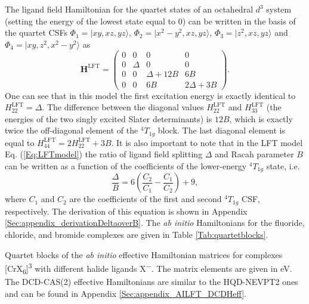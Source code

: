 The ligand field Hamiltonian for the quartet states of an octahedral $d^3$ system (setting the energy of the lowest state equal to 0) can be written in the basis of the quartet CSFs ${\Phi _1} = |xy,xz,yz\rangle $, ${\Phi _2} = |{x^2} - {y^2},xz,yz\rangle $, ${\Phi _3} = |{z^2},xz,yz\rangle $ and ${\Phi _4} = |xy,{z^2},{x^2} - {y^2}\rangle $ as
	\begin{equation}
	\label{Eq:LFTmodel}
	{{\mathbf{H}}^{{\text{LFT}}}} = \left( {\begin{array}{*{20}{c}}
  0&0&0&0 \\ 
  0&\Delta &0&0 \\ 
  0&0&{\Delta  + 12B}&{6B} \\ 
  0&0&{6B}&{2\Delta  + 3B} 
\end{array}} \right).
\end{equation}
One can see that in this model the first excitation energy is exactly identical to $H_{22}^{{\text{LFT}}} = \Delta $. The difference between the diagonal values $H_{22}^{{\text{LFT}}}$ and $H_{33}^{{\text{LFT}}}$ (the energies of the two singly excited Slater determinants) is $12B$, which is exactly twice the off-diagonal element of the $^4T_{1g}$ block. The last diagonal element is equal to $H_{44}^{{\text{LFT}}} = 2H_{22}^{{\text{LFT}}} + 3B$. It is also important to note that in the LFT model Eq. (\ref{Eq:LFTmodel}) the ratio of ligand field splitting $\Delta $ and Racah parameter $B$ can be written as a function of the coefficients of the lower-energy $^4T_{1g}$ state, i.e.
	\begin{equation}
	\label{Eq:DeltaoverB}
	\frac{\Delta }{B} = 6\left( {\frac{{{C_2}}}{{{C_1}}} - \frac{{{C_1}}}{{{C_2}}}} \right) + 9,
	\end{equation}
where ${C_1}$ and ${C_2}$ are the coefficients of the first and second $^4T_{1g}$ CSF, respectively. The derivation of this equation is shown in Appendix \ref{Sec:appendix_derivationDeltaoverB}.
The \textit{ab initio} Hamiltonians for the fluoride, chloride, and bromide complexes are given in Table \ref{Tab:quartetblocks}.
\begin{table}
\small
\centering
\ttabbox
{\caption[Quartet blocks of the \textit{ab initio} effective Hamiltonian matrices for complexes {[CrX\textsubscript{6}]}\textsuperscript{3\textminus}.]{Quartet blocks of the \textit{ab initio} effective Hamiltonian matrices for complexes [CrX\textsubscript{6}]\textsuperscript{3\textminus} with different halide ligands X\textsuperscript{−}. The matrix elements are given in eV. The DCD-CAS(2) effective Hamiltonians are similar to the HQD-NEVPT2 ones and can be found in Appendix \ref{Sec:appendix_AILFT_DCDHeff}.}
\label{Tab:quartetblocks}}
{}
\end{table}
